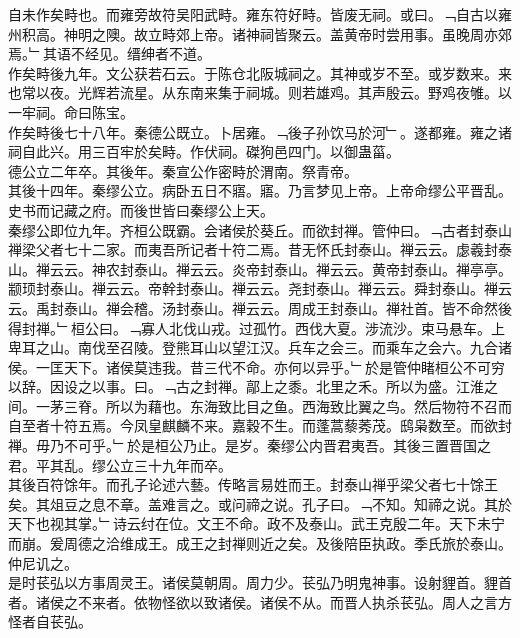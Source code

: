 \documentclass{zhvt-classic}
\begin{document}
\hspace*{2em}自未作矣畤也。而雍旁故符吴阳武畤。雍东符好畤。皆废无祠。或曰。﹁自古以雍州积高。神明之隩。故立畤郊上帝。诸神祠皆聚云。盖黄帝时尝用事。虽晚周亦郊焉。﹂其语不经见。缙绅者不道。\\
\hspace*{2em}作矣畤後九年。文公获若石云。于陈仓北阪城祠之。其神或岁不至。或岁数来。来也常以夜。光辉若流星。从东南来集于祠城。则若雄鸡。其声殷云。野鸡夜雊。以一牢祠。命曰陈宝。\\
\hspace*{2em}作矣畤後七十八年。秦德公既立。卜居雍。﹁後子孙饮马於河﹂。遂都雍。雍之诸祠自此兴。用三百牢於矣畤。作伏祠。磔狗邑四门。以御蛊菑。\\
\hspace*{2em}德公立二年卒。其後年。秦宣公作密畤於渭南。祭青帝。\\
\hspace*{2em}其後十四年。秦缪公立。病卧五日不寤。寤。乃言梦见上帝。上帝命缪公平晋乱。史书而记藏之府。而後世皆曰秦缪公上天。\\
\hspace*{2em}秦缪公即位九年。齐桓公既霸。会诸侯於葵丘。而欲封禅。管仲曰。﹁古者封泰山禅梁父者七十二家。而夷吾所记者十符二焉。昔无怀氏封泰山。禅云云。虙羲封泰山。禅云云。神农封泰山。禅云云。炎帝封泰山。禅云云。黄帝封泰山。禅亭亭。颛顼封泰山。禅云云。帝幹封泰山。禅云云。尧封泰山。禅云云。舜封泰山。禅云云。禹封泰山。禅会稽。汤封泰山。禅云云。周成王封泰山。禅社首。皆不命然後得封禅。﹂桓公曰。﹁寡人北伐山戎。过孤竹。西伐大夏。涉流沙。束马悬车。上卑耳之山。南伐至召陵。登熊耳山以望江汉。兵车之会三。而乘车之会六。九合诸侯。一匡天下。诸侯莫违我。昔三代不命。亦何以异乎。﹂於是管仲睹桓公不可穷以辞。因设之以事。曰。﹁古之封禅。鄗上之黍。北里之禾。所以为盛。江淮之间。一茅三脊。所以为藉也。东海致比目之鱼。西海致比翼之鸟。然后物符不召而自至者十符五焉。今凤皇麒麟不来。嘉穀不生。而蓬蒿藜莠茂。鸱枭数至。而欲封禅。毋乃不可乎。﹂於是桓公乃止。是岁。秦缪公内晋君夷吾。其後三置晋国之君。平其乱。缪公立三十九年而卒。\\
\hspace*{2em}其後百符馀年。而孔子论述六藝。传略言易姓而王。封泰山禅乎梁父者七十馀王矣。其俎豆之息不章。盖难言之。或问禘之说。孔子曰。﹁不知。知禘之说。其於天下也视其掌。﹂诗云纣在位。文王不命。政不及泰山。武王克殷二年。天下未宁而崩。爰周德之洽维成王。成王之封禅则近之矣。及後陪臣执政。季氏旅於泰山。仲尼讥之。\\
\hspace*{2em}是时苌弘以方事周灵王。诸侯莫朝周。周力少。苌弘乃明鬼神事。设射貍首。貍首者。诸侯之不来者。依物怪欲以致诸侯。诸侯不从。而晋人执杀苌弘。周人之言方怪者自苌弘。\\
\end{document}
